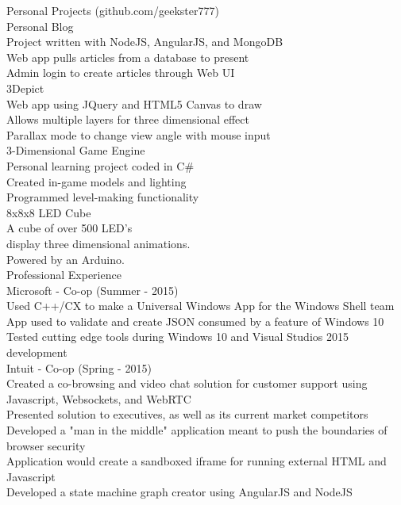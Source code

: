 \documentclass{article}
\begin{document}
{\Large Personal Projects (github.com/geekster777) } \\
{\large Personal Blog } \\
Project written with NodeJS, AngularJS, and MongoDB \\
Web app pulls articles from a database to present \\
Admin login to create articles through Web UI \\
{\large 3Depict } \\
Web app using JQuery and HTML5 Canvas to draw \\
Allows multiple layers for three dimensional effect \\
Parallax mode to change view angle with mouse input \\
{\large 3-Dimensional Game Engine } \\
Personal learning project coded in C\# \\
Created in-game models and lighting  \\
Programmed level-making functionality \\
{\large 8x8x8 LED Cube } \\
A cube of over 500 LED's \\
display three dimensional animations. \\
Powered by an Arduino. \\
{\Large Professional Experience } \\
{\large Microsoft - Co-op (Summer - 2015) } \\
Used C++/CX to make a Universal Windows App for the Windows Shell team \\
App used to validate and create JSON consumed by a feature of Windows 10 \\
Tested cutting edge tools during Windows 10 and Visual Studios 2015 development \\
{\large Intuit - Co-op (Spring - 2015) } \\
Created a co-browsing and video chat solution for customer support using Javascript, Websockets, and WebRTC \\
Presented solution to executives, as well as its current market competitors \\
Developed a "man in the middle" application meant to push the boundaries of browser security \\
Application would create a sandboxed iframe for running external HTML and Javascript \\
Developed a state machine graph creator using AngularJS and NodeJS \\
\end{document}

